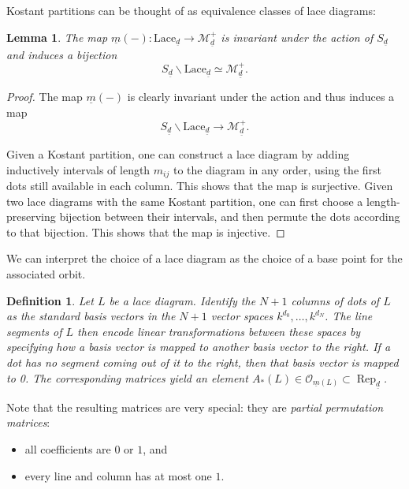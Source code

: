 \documentclass[a4paper]{amsart}
\DeclareMathOperator{\Rep}{\mathrm{Rep}}
\newcommand{\CO}{\mathcal{O}}
\newcommand{\CM}{\mathcal{M}}
\newcommand{\um}{\underline{m}}
\newcommand{\ud}{\underline{d}}
\newcommand{\Sym}{S}  %
\newcommand{\Lace}{\mathrm{Lace}}
\newtheorem{lemma}[thm]{Lemma}
\newtheorem{defn}[thm]{Definition}
\theoremstyle{plain}
\begin{document}
Kostant partitions can be thought of as equivalence classes of lace diagrams:

\begin{lemma}\label{lem:Kostant_lace}
 The map $\um(-):\Lace_{\ud}\to \CM^+_{\ud}$ is invariant under the action of $\Sym_{\ud}$ and induces a bijection
    \[
    \Sym_{\ud}\backslash\Lace_{\ud}\simeq \CM^+_{\ud}.
    \]
\end{lemma}
\begin{proof}
    The map $\um(-)$ is clearly invariant under the action and thus induces a map 
    \[\Sym_{\ud}\backslash\Lace_{\ud}\to \CM^+_{\ud}.\] 
    
    Given a Kostant partition, one can construct a lace diagram by adding inductively intervals of length $m_{ij}$ to the diagram in any order, using the first dots still available in each column. This shows that the map is surjective. Given two lace diagrams with the same Kostant partition, one can first choose a length-preserving bijection between their intervals, and then permute the dots according to that bijection. This shows that the map is injective.
\end{proof}


We can interpret the choice of a lace diagram as the choice of a base point for the associated orbit.

\begin{defn}
    Let $L$ be a lace diagram. Identify the $N+1$ columns of dots of $L$ as the standard basis vectors in the $N+1$ vector spaces $k^{d_0},\ldots,k^{d_N}$. The line segments of $L$ then encode linear transformations between these spaces by specifying how a basis vector is mapped to another basis vector to the right. If a dot has no segment coming out of it to the right, then that basis vector is mapped to 0. The corresponding matrices yield an element $A_*(L)\in\CO_{\um(L)}\subset\Rep_{\ud}$. 
\end{defn}

Note that the resulting matrices are very special: they are {\em partial permutation matrices}:
\begin{itemize}
    \item all coefficients are $0$ or $1$, and
    \item every line and column has at most one $1$.
\end{itemize}
\end{document}
